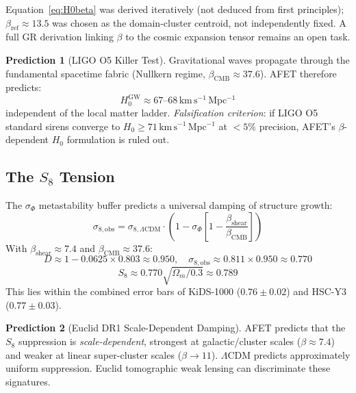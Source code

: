 \documentclass[12pt,a4paper]{article}
\theoremstyle{definition}
\newtheorem{prediction}{Prediction}
\newcommand{\betaref}{\beta_{\mathrm{ref}}}
\newcommand{\betaCMB}{\beta_{\mathrm{CMB}}}
\newcommand{\sigphi}{\sigma_{\Phi}}
\begin{document}
\begin{hypothesis}
Equation~\eqref{eq:H0beta} was derived iteratively (not deduced from first principles);
$\betaref \approx 13.5$ was chosen as the domain-cluster centroid, not independently
fixed. A full GR derivation linking $\beta$ to the cosmic expansion tensor remains
an open task.
\end{hypothesis}

\begin{prediction}[LIGO O5 Killer Test]
\label{pred:LIGO}
Gravitational waves propagate through the fundamental spacetime fabric
(Nullkern regime, $\betaCMB \approx 37.6$).
AFET therefore predicts:
\[
  H_0^{\mathrm{GW}} \approx 67\text{--}68\,\mathrm{km\,s^{-1}\,Mpc^{-1}}
\]
independent of the local matter ladder.
\textit{Falsification criterion}: if LIGO O5 standard sirens converge to
$H_0 \geq 71\,\mathrm{km\,s^{-1}\,Mpc^{-1}}$ at $<5\%$ precision,
AFET's $\beta$-dependent $H_0$ formulation is ruled out.
\end{prediction}

\subsection{The $S_8$ Tension}

\begin{validated}
The $\sigphi$ metastability buffer predicts a universal damping of structure growth:
\begin{equation}
  \sigma_{8,\mathrm{obs}} = \sigma_{8,\Lambda\mathrm{CDM}}
    \cdot\left(1 - \sigphi\left[1 - \frac{\beta_{\mathrm{shear}}}{\betaCMB}\right]\right)
\end{equation}
With $\beta_{\mathrm{shear}} \approx 7.4$ and $\betaCMB \approx 37.6$:
\[
  D \approx 1 - 0.0625 \times 0.803 \approx 0.950,\quad
  \sigma_{8,\mathrm{obs}} \approx 0.811 \times 0.950 \approx 0.770
\]
\[
  S_8 \approx 0.770\sqrt{\Omega_m/0.3} \approx 0.789
\]
This lies within the combined error bars of KiDS-1000 ($0.76\pm0.02$)
and HSC-Y3 ($0.77\pm0.03$).
\end{validated}

\begin{prediction}[Euclid DR1 Scale-Dependent Damping]
AFET predicts that the $S_8$ suppression is \emph{scale-dependent}, strongest at
galactic/cluster scales ($\beta \approx 7.4$) and weaker at linear super-cluster
scales ($\beta \to 11$).
$\Lambda$CDM predicts approximately uniform suppression.
Euclid tomographic weak lensing can discriminate these signatures.
\end{prediction}
\end{document}
